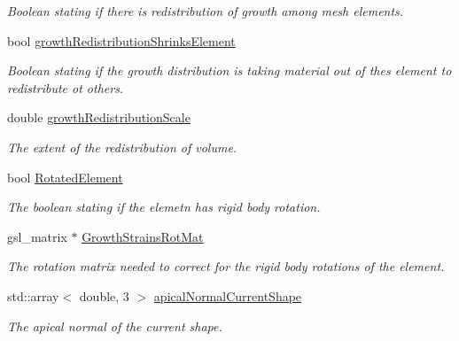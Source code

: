 \begin{DoxyCompactItemize}
\begin{DoxyCompactList}\small\item\em Boolean stating if there is redistribution of growth among mesh elements. \end{DoxyCompactList}\item 
\hypertarget{classShapeBase_a7112715f6a436f2500793f67991b612c}{}bool \hyperlink{classShapeBase_a7112715f6a436f2500793f67991b612c}{growth\+Redistribution\+Shrinks\+Element}\label{classShapeBase_a7112715f6a436f2500793f67991b612c}

\begin{DoxyCompactList}\small\item\em Boolean stating if the growth distribution is taking material out of thes element to redistribute ot others. \end{DoxyCompactList}\item 
\hypertarget{classShapeBase_a0c7adb65c236a91a84acd9c1add5dc50}{}double \hyperlink{classShapeBase_a0c7adb65c236a91a84acd9c1add5dc50}{growth\+Redistribution\+Scale}\label{classShapeBase_a0c7adb65c236a91a84acd9c1add5dc50}

\begin{DoxyCompactList}\small\item\em The extent of the redistribution of volume. \end{DoxyCompactList}\item 
\hypertarget{classShapeBase_af64f900d51cec3e48a488fdd8a51eacf}{}bool \hyperlink{classShapeBase_af64f900d51cec3e48a488fdd8a51eacf}{Rotated\+Element}\label{classShapeBase_af64f900d51cec3e48a488fdd8a51eacf}

\begin{DoxyCompactList}\small\item\em The boolean stating if the elemetn has rigid body rotation. \end{DoxyCompactList}\item 
\hypertarget{classShapeBase_acc1408c3e89b91787fec7e913cac1f58}{}gsl\+\_\+matrix $\ast$ \hyperlink{classShapeBase_acc1408c3e89b91787fec7e913cac1f58}{Growth\+Strains\+Rot\+Mat}\label{classShapeBase_acc1408c3e89b91787fec7e913cac1f58}

\begin{DoxyCompactList}\small\item\em The rotation matrix needed to correct for the rigid body rotations of the element. \end{DoxyCompactList}\item 
\hypertarget{classShapeBase_a38e7fb504d13f5d98d75c766e39e0143}{}std\+::array$<$ double, 3 $>$ \hyperlink{classShapeBase_a38e7fb504d13f5d98d75c766e39e0143}{apical\+Normal\+Current\+Shape}\label{classShapeBase_a38e7fb504d13f5d98d75c766e39e0143}

\begin{DoxyCompactList}\small\item\em The apical normal of the current shape. \end{DoxyCompactList}\end{DoxyCompactItemize}

